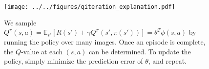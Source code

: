 \begin{figure}[ht]
\centering
\texttt{[image: ../../figures/qiteration\_explanation.pdf]}
\caption[
Explanation of the Q-iteration method.]{
We sample $Q^\pi(s, a) = \mathbb{E}_{s'} \left[ R(s') + \gamma Q^\pi(s', \pi(s')) \right] = \theta^T \phi(s, a)$ by running the policy over many images.
Once an episode is complete, the $Q$-value at each $(s, a)$ can be determined.
To update the policy, simply minimize the prediction error of $\theta$, and repeat.
\label{fig:qiteration_explanation}}
\end{figure}
